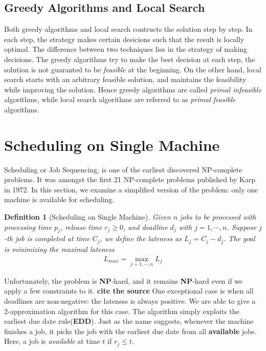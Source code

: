 \documentclass[11pt,psfig,times]{article}
\newcommand*{\NP}{\textbf{NP}}
\newtheorem{definition}[theorem]{Definition}
\begin{document}
\subsection{Greedy Algorithms and Local Search}
Both greedy algorithms and local search contructs the solution step by step. 
In each step, the strategy makes certain desicions such that the result is locally optimal. 
The difference between two techniques lies in the strategy of making decisions. 
The greedy algorithms try to make the best decision at each step, the solution is not guaranted to 
be \textit{feasible} at the beginning. On the other hand, local search starts with an arbitrary feasible solution,
and maintains the feasibility while improving the solution. 
Hence greedy algorithms are called \textit{primal infeasible} algorithms, while local search algorithms 
are referred to as \textit{primal feasible} algorithms.


\section{Scheduling on Single Machine}
Scheduling or Job Sequencing, is one of the earliest discovered NP-complete problems. 
It was amongst the first 21 NP-complete problems published by Karp in 1972. In this section, 
we examine a simplified version of the problem: only one machine is available for scheduling.
\begin{definition}[Scheduling on Single Machine]
    Given $n$ jobs to be processed with processing time $p_j$, release time $r_j \geq 0$, and deadline $d_j$ with $j = 1, \cdots, n$.
    Suppose $j$-th job is completed at time $C_j$, we define the lateness as $L_j = C_j - d_j$. The goal is minimizing the maximal lateness 
    \begin{align*}
        L_{max} = \max_{j = 1, \cdots, n} L_j
    \end{align*}
\end{definition} 
Unfortunately, the problem is \NP-hard, and it remains \NP-hard even if we apply 
a few constraints to it. \textbf{cite the source} One exceptional case is when all deadlines are non-negative: the lateness is always positive. 
We are able to give a 2-approximation algorithm for this case. The algorithm simply exploits the earliest due date rule(\textbf{EDD}). 
Just as the name suggests, whenever the machine finishes a job, it picks the job with the earliest due date from all \textbf{available} jobs.
Here, a job is \textit{available} at time $t$ if $r_j \leq t$.
\end{document}

